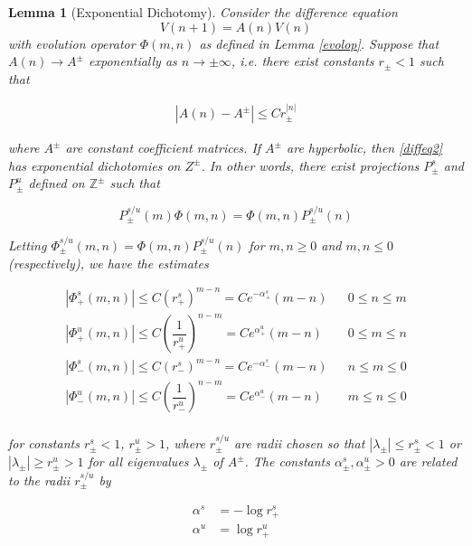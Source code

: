 \documentclass[12pt]{article}
\def\Z{{\mathbb Z}}
\newtheorem{lemma}{Lemma}
\begin{document}
\begin{lemma}[Exponential Dichotomy]\label{dichotomy}
Consider the difference equation
\begin{equation}\label{diffeq3}
V(n+1) = A(n) V(n)
\end{equation}
with evolution operator $\Phi(m, n)$ as defined in Lemma \ref{evolop}. Suppose that $A(n) \rightarrow A^\pm$ exponentially as $n \rightarrow \pm \infty$, i.e. there exist constants $r_\pm < 1$ such that

\begin{align*}
|A(n) - A^\pm| \leq C r_\pm^{|n|}
\end{align*}

where $A^\pm$ are constant coefficient matrices. If $A^\pm$ are hyperbolic, then \eqref{diffeq2} has exponential dichotomies on $Z^\pm$. In other words, there exist projections $P_\pm^s$ and $P_\pm^u$ defined on $\Z^\pm$ such that

\begin{equation}\label{projcommute}
P_\pm^{s/u}(m) \Phi(m, n) =  \Phi(m, n) P_\pm^{s/u}(n)
\end{equation}

Letting $\Phi_\pm^{s/u}(m, n) = \Phi(m, n) P_\pm^{s/u}(n)$ for $m, n \geq 0$ and $m, n \leq 0$ (respectively), we have the estimates

\begin{align*}
|\Phi_+^s(m, n)| \leq C (r_+^s)^{m - n} = C e^{-\alpha_+^s}(m - n) && 0 \leq n \leq m \\
|\Phi_+^u(m, n)| \leq C \left( \dfrac{1}{r_+^u} \right)^{n-m} = C e^{\alpha_+^u}(m - n) && 0 \leq m \leq n \\
|\Phi_-^s(m, n)| \leq C (r_-^s)^{m - n} = C e^{-\alpha_-^s}(m - n) && n \leq m \leq 0 \\
|\Phi_-^u(m, n)| \leq C \left( \dfrac{1}{r_-^u} \right)^{n-m} = C e^{\alpha_-^u}(m - n) && m \leq n \leq 0\\
\end{align*}

for constants $r_\pm^s < 1$, $r_\pm^u > 1$, where $r_\pm^{s/u}$ are radii chosen so that $|\lambda_\pm| \leq r_\pm^s < 1$ or $|\lambda_\pm| \geq r_\pm^u > 1$ for all eigenvalues $\lambda_\pm$ of $A^\pm$. The constants $\alpha_\pm^s, \alpha_\pm^u > 0$ are related to the radii $r_\pm^{s/u}$ by

\begin{align*}
\alpha^s &= -\log r_+^s\\
\alpha^u &= \log r_+^u
\end{align*}
 

\end{lemma}
\end{document}
